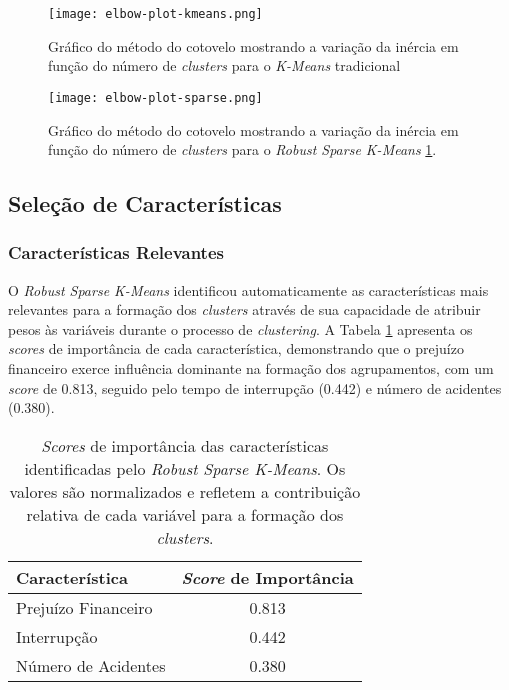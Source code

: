 \documentclass[conference]{IEEEtran}
\begin{document}
\begin{figure}[!htb]
    \centering
    \texttt{[image: elbow-plot-kmeans.png]}
    \caption{Gráfico do método do cotovelo mostrando a variação da inércia em função do número de \textit{clusters} para o \textit{K-Means} tradicional}
    \label{fig:elbow-plot-kmeans}
\end{figure}

\begin{figure}[!htb]
    \centering
    \texttt{[image: elbow-plot-sparse.png]}
    \caption{Gráfico do método do cotovelo mostrando a variação da inércia em função do número de \textit{clusters} para o \textit{Robust Sparse K-Means}
    \ref{fig:elbow-plot-kmeans}.}
    \label{fig:elbow-plot-sparse-kmeans}
\end{figure}


\subsection{Seleção de Características}

\subsubsection{Características Relevantes}
O \textit{Robust Sparse K-Means} identificou automaticamente as características mais relevantes para a formação dos \textit{clusters} através de sua capacidade de atribuir pesos às variáveis durante o processo de \textit{clustering}. A Tabela \ref{tab:feature_scores} apresenta os \textit{scores} de importância de cada característica, demonstrando que o prejuízo financeiro exerce influência dominante na formação dos agrupamentos, com um \textit{score} de 0.813, seguido pelo tempo de interrupção (0.442) e número de acidentes (0.380).

\begin{table}[!htb]
    \centering
    \begin{tabular}{|l|c|}
        \hline
        \textbf{Característica} & \textbf{\textit{Score} de Importância} \\
        \hline
        Prejuízo Financeiro & 0.813 \\
        Interrupção & 0.442 \\
        Número de Acidentes & 0.380 \\
        \hline
    \end{tabular}
    \caption[]{\textit{Scores} de importância das características identificadas pelo \textit{Robust Sparse K-Means}. Os valores são normalizados e refletem a contribuição relativa de cada variável para a formação dos \textit{clusters}.}
    \label{tab:feature_scores}
\end{table}
\end{document}
